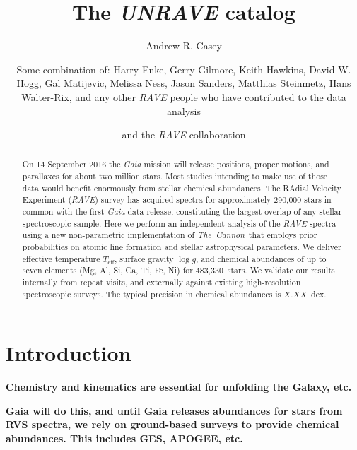 \documentclass[preprint2,trackchanges]{aastex}
\newcommand{\project}[1]{\textsl{#1}}
\newcommand{\thecannon}{\project{The~Cannon}}
\newcommand{\logg}{\log g}
\newcommand{\teff}{T_{\mathrm{eff}}}
\newcommand{\stub}[1]{\textbf{#1}}
\newcommand{\Nstars}{483,330}
\begin{document}
\title{The \project{UNRAVE} catalog}

\author{Andrew R. Casey}

\author{Some combination of: Harry Enke, Gerry Gilmore, Keith Hawkins, David W. Hogg, Gal Matijevic, Melissa Ness, Jason Sanders, Matthias Steinmetz, Hans Walter-Rix, and any other \project{RAVE} people who have contributed to the data analysis}

\author{and the \project{RAVE} collaboration}

\begin{abstract}
On 14 September 2016 the \project{Gaia} mission will release positions, proper motions, and parallaxes for about two million stars.  Most studies intending to make use of those data would benefit enormously from stellar chemical abundances.  The RAdial Velocity Experiment (\project{RAVE}) survey has acquired spectra for approximately 290,000 stars in common with the first \project{Gaia} data release, constituting the largest overlap of any stellar spectroscopic sample.  Here we perform an independent analysis of the \project{RAVE} spectra using a new non-parametric implementation of \thecannon\ that employs prior probabilities on atomic line formation and stellar astrophysical parameters.  We deliver effective temperature $\teff$, surface gravity $\logg$, and chemical abundances of up to seven elements (Mg, Al, Si, Ca, Ti, Fe, Ni) for \Nstars\ stars.  We validate our results internally from repeat visits, and externally against existing high-resolution spectroscopic surveys.  The typical precision in chemical abundances is $X.XX$~dex.  
\end{abstract}

\keywords{}

\section{Introduction} 
\label{sec:introduction}

\stub{Chemistry and kinematics are essential for unfolding the Galaxy, etc.}

\stub{
Gaia will do this, and until Gaia releases abundances for stars from RVS 
spectra, we rely on ground-based surveys to provide chemical abundances.
This includes GES, APOGEE, etc.
}
\end{document}
